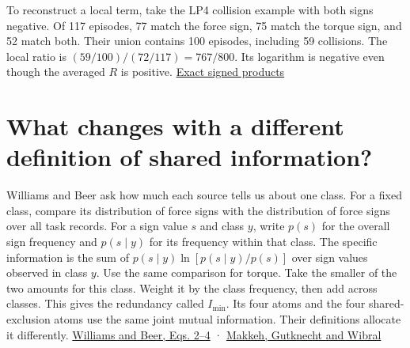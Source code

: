 To reconstruct a local term, take the LP4 collision example with both signs negative. Of 117 episodes, 77 match the force sign, 75 match the torque sign, and 52 match both. Their union contains 100 episodes, including 59 collisions. The local ratio is \((59/100)/(72/117)=767/800\). Its logarithm is negative even though the averaged \(R\) is positive. \href{https://github.com/sepahead/pid-rs/blob/main/audit/research/robot-wrist-slope-signs/certificate.json}{Exact signed products}

\clearpage

\section{What changes with a different definition of shared information?}\label{what-changes-with-a-different-definition-of-shared-information}

Williams and Beer ask how much each source tells us about one class. For a fixed class, compare its distribution of force signs with the distribution of force signs over all task records. For a sign value \(s\) and class \(y\), write \(p(s)\) for the overall sign frequency and \(p(s\mid y)\) for its frequency within that class. The specific information is the sum of \(p(s\mid y)\ln[p(s\mid y)/p(s)]\) over sign values observed in class \(y\). Use the same comparison for torque. Take the smaller of the two amounts for this class. Weight it by the class frequency, then add across classes. This gives the redundancy called \(I_{\min}\). Its four atoms and the four shared-exclusion atoms use the same joint mutual information. Their definitions allocate it differently. \href{https://arxiv.org/abs/1004.2515v1}{Williams and Beer, Eqs. 2--4} · \href{https://arxiv.org/abs/2002.03356v5}{Makkeh, Gutknecht and Wibral}

